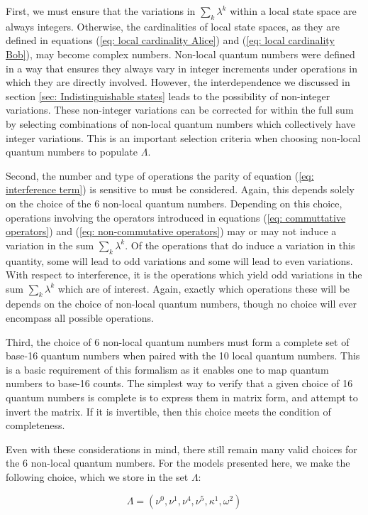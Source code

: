 \documentclass{article}
\begin{document}
First, we must ensure that the variations in $\sum_{k}\lambda^k$ within a local state space are always integers. Otherwise, the cardinalities of local state spaces, as they are defined in equations (\ref{eq: local cardinality Alice}) and (\ref{eq: local cardinality Bob}), may become complex numbers. Non-local quantum numbers were defined in a way that ensures they always vary in integer increments under operations in which they are directly involved. However, the interdependence we discussed in section \ref{sec: Indistinguishable states} leads to the possibility of non-integer variations. These non-integer variations can be corrected for within the full sum by selecting combinations of non-local quantum numbers which collectively have integer variations. This is an important selection criteria when choosing non-local quantum numbers to populate $\Lambda$.

Second, the number and type of operations the parity of equation (\ref{eq: interference term}) is sensitive to must be considered. Again, this depends solely on the choice of the 6 non-local quantum numbers. Depending on this choice, operations involving the operators introduced in equations (\ref{eq: commuttative operators}) and (\ref{eq: non-commutative operators}) may or may not induce a variation in the sum $\sum_{k}\lambda^k$. Of the operations that do induce a variation in this quantity, some will lead to odd variations and some will lead to even variations. With respect to interference, it is the operations which yield odd variations in the sum $\sum_{k}\lambda^k$ which are of interest. Again, exactly which operations these will be depends on the choice of non-local quantum numbers, though no choice will ever encompass all possible operations.

Third, the choice of 6 non-local quantum numbers must form a complete set of base-16 quantum numbers when paired with the 10 local quantum numbers. This is a basic requirement of this formalism as it enables one to map quantum numbers to base-16 counts. The simplest way to verify that a given choice of 16 quantum numbers is complete is to express them in matrix form, and attempt to invert the matrix. If it is invertible, then this choice meets the condition of completeness. 

Even with these considerations in mind, there still remain many valid choices for the 6 non-local quantum numbers. For the models presented here, we make the following choice, which we store in the set $\Lambda$:

\begin{equation}
    \Lambda=( \nu^0,\nu^1,\nu^4,\nu^5, \kappa^1, \omega^2)
    \label{eq: non-local number choice}
\end{equation}
\end{document}
